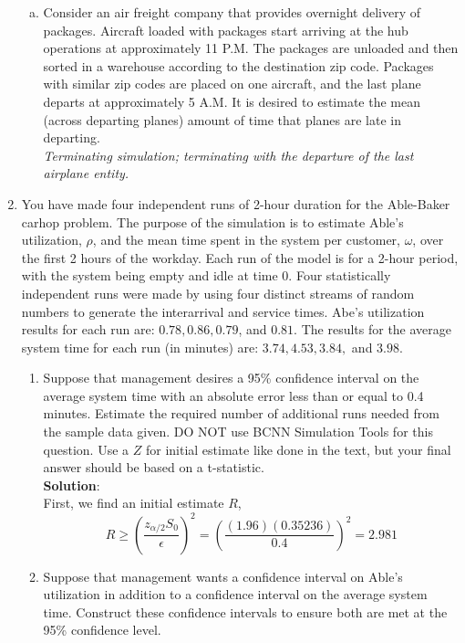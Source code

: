 \documentclass[12pt]{amsart}
\begin{document}
\begin{enumerate}[1.]
\begin{enumerate}[a.]
	\item Consider an air freight company that provides overnight delivery of packages. Aircraft
	loaded with packages start arriving at the hub operations at approximately 11 P.M. The
	packages are unloaded and then sorted in a warehouse according to the destination zip code.
	Packages with similar zip codes are placed on one aircraft, and the last plane departs at
	approximately 5 A.M. It is desired to estimate the mean (across departing planes) amount
	of time that planes are late in departing. \\
	
	\textit{Terminating simulation; terminating with the departure of the last
		airplane entity.}\\
	
\end{enumerate}
\clearpage

\item You have made four independent runs of 2-hour duration for the Able-Baker carhop problem.
The purpose of the simulation is to estimate Able’s utilization, \(\rho\), and the mean time spent in
the system per customer, \(\omega\), over the first 2 hours of the workday. Each run of the model is for
a 2-hour period, with the system being empty and idle at time 0. Four statistically independent
runs were made by using four distinct streams of random numbers to generate the interarrival
and service times. Abe’s utilization results for each run are: \(0.78, 0.86, 0.79\), and \(0.81\). The
results for the average system time for each run (in minutes) are: \(3.74, 4.53, 3.84,\) and \(3.98\). \\

\begin{enumerate}
	\item Suppose that management desires a 95\% confidence interval on the average system time
	with an absolute error less than or equal to 0.4 minutes. Estimate the required number of
	additional runs needed from the sample data given. DO NOT use BCNN Simulation Tools
	for this question. Use a \(Z\) for initial estimate like done in the text, but your final answer
	should be based on a t-statistic. \\
	
	\textbf{Solution}:\\
	
	First, we find an initial estimate $R$,
	\[R \geq \left(\frac{z_{\alpha/2}S_0}{\epsilon}\right)^2 = \left(\frac{(1.96)(0.35236)}{0.4}\right)^2 = 2.981 \]
	
	
	
	\item Suppose that management wants a confidence interval on Able’s utilization in addition to a
	confidence interval on the average system time. Construct these confidence intervals to
	ensure both are met at the 95\% confidence level. \\
	
	\textit{}\\
	
\end{enumerate}



\end{enumerate}
	
\end{document}

